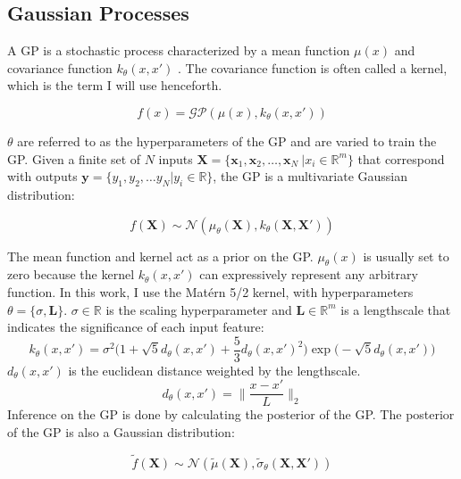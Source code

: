 \subsection{Gaussian Processes}

A GP is a stochastic process characterized by a mean function $\mu(x)$ and covariance function $k_{\theta}(x,x')$ \cite{Rasmussen2006}. The covariance function is often called a kernel, which is the term I will use henceforth.

\begin{equation}
    f(x)= \mathcal{GP}(\mu(x), k_{\theta}(x, x'))
\end{equation}

$\theta$ are referred to as the hyperparameters of the GP and are varied to train the GP. Given a finite set of $N$ inputs $\mathbf X = \{\mathbf x_1, \mathbf x_2, \dots, \mathbf x_N \ \vert x_i \in \mathbb R^m \}$ that correspond with outputs $\mathbf y = \{y_1, y_2, \dots y_N \vert  y_i \in \mathbb R \}$, the GP is a multivariate Gaussian distribution:

\begin{equation}
    f(\mathbf X) \sim \mathcal N(\mu_{\theta}(\mathbf X), k_{\theta}(\mathbf X, \mathbf X'))
\end{equation}

The mean function and kernel act as a prior on the GP.  $\mu_{\theta}(x)$ is usually set to zero because the kernel  $k_{\theta}(x, x')$ can expressively represent any arbitrary function. In this work, I use the Matérn 5/2 kernel, with hyperparameters $\theta=\{\sigma,\mathbf L \}$. $\sigma \in \mathbb R$ is the scaling hyperparameter and $\mathbf L \in \mathbb R^m$ is a lengthscale that indicates the significance of each input feature:
\begin{equation}
    k_{\theta}(x, x') = \sigma^2 \biggl(1 + \sqrt{5}d_{\theta}(x,x')+\frac{5}{3}d_{\theta}(x,x')^2\biggr)\exp\biggl(-\sqrt{5}d_{\theta}(x,x') \biggr)
\end{equation}
$d_{\theta}(x,x')$ is the euclidean distance weighted by the lengthscale.
\begin{equation}
    d_{\theta}(x,x')=\biggl\lVert \frac{x-x'}{L} \biggr\rVert_2
\end{equation}
Inference on the GP is done by calculating the posterior of the GP. The posterior of the GP is also a Gaussian distribution:

\begin{equation}
     \tilde f(\mathbf X) \sim \mathcal N(\tilde \mu(\mathbf X), \tilde \sigma_{\theta}(\mathbf X, \mathbf X'))
\end{equation}


